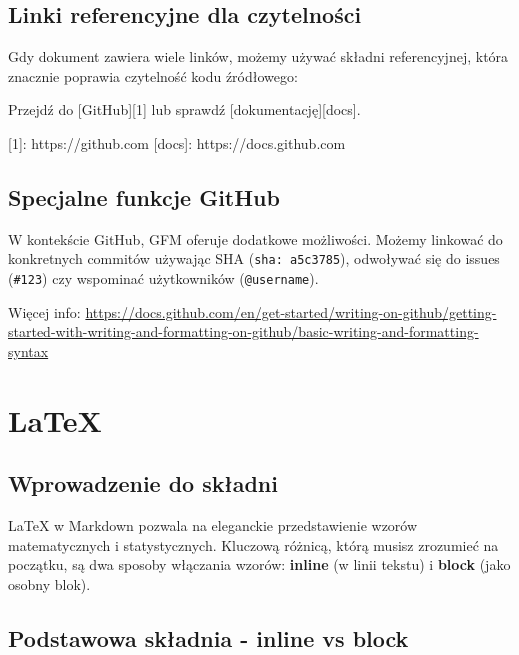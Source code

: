 \documentclass[
  polish,
  letterpaper,
  DIV=11,
  numbers=noendperiod]{scrreprt}
\newenvironment{Shaded}{\begin{snugshade}}{\end{snugshade}}
\newcommand{\CommentTok}[1]{\textcolor[rgb]{0.37,0.37,0.37}{#1}}
\newcommand{\NormalTok}[1]{\textcolor[rgb]{0.00,0.23,0.31}{#1}}
\newcommand{\OtherTok}[1]{\textcolor[rgb]{0.00,0.23,0.31}{#1}}
\begin{document}
\section{Linki referencyjne dla
czytelności}\label{linki-referencyjne-dla-czytelnoux15bci}

Gdy dokument zawiera wiele linków, możemy używać składni referencyjnej,
która znacznie poprawia czytelność kodu źródłowego:

\begin{Shaded}
\begin{Highlighting}[]
\NormalTok{Przejdź do }\CommentTok{[}\OtherTok{GitHub}\CommentTok{][1]}\NormalTok{ lub sprawdź }\CommentTok{[}\OtherTok{dokumentację}\CommentTok{][docs]}\NormalTok{.}

\OtherTok{[1]: https://github.com}
\OtherTok{[docs]: https://docs.github.com}
\end{Highlighting}
\end{Shaded}

\section{Specjalne funkcje GitHub}\label{specjalne-funkcje-github}

W kontekście GitHub, GFM oferuje dodatkowe możliwości. Możemy linkować
do konkretnych commitów używając SHA (\texttt{sha:\ a5c3785}), odwoływać
się do issues (\texttt{\#123}) czy wspominać użytkowników
(\texttt{@username}).

Więcej info:
\url{https://docs.github.com/en/get-started/writing-on-github/getting-started-with-writing-and-formatting-on-github/basic-writing-and-formatting-syntax}

\chapter{LaTeX}\label{latex}

\section{Wprowadzenie do składni}\label{wprowadzenie-do-skux142adni}

LaTeX w Markdown pozwala na eleganckie przedstawienie wzorów
matematycznych i statystycznych. Kluczową różnicą, którą musisz
zrozumieć na początku, są dwa sposoby włączania wzorów: \textbf{inline}
(w linii tekstu) i \textbf{block} (jako osobny blok).

\section{Podstawowa składnia - inline vs
block}\label{podstawowa-skux142adnia---inline-vs-block}
\end{document}

